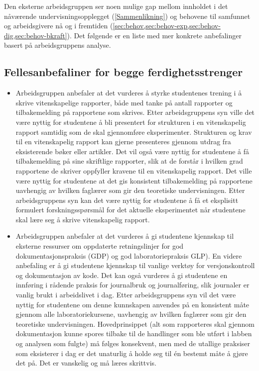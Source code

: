 \documentclass{article}
\begin{document}
Den eksterne arbeidsgruppen ser noen mulige gap mellom innholdet i det nåværende undervisningsopplegget (\cref{Sammenlikning}) og behovene til samfunnet og arbeidsgivere nå og i fremtiden (\cref{sec:behov,sec:behov-exp,sec:behov-dig,sec:behov-bkraft}). Det følgende er en liste med mer konkrete anbefalinger basert på arbeidsgruppens analyse.

\subsection{Fellesanbefaliner for begge ferdighetsstrenger}

\begin{itemize}
 
  
  \item Arbeidsgruppen anbefaler at det vurderes å styrke studentenes trening i å skrive vitenskapelige rapporter, både med tanke på antall rapporter og tilbakemelding på rapportene som skrives. Etter arbeidsgruppens syn ville det være nyttig for studentene å bli presentert for strukturen i en vitenskapelig rapport samtidig som de skal gjennomføre eksperimenter. Strukturen og krav til en vitenskapelig rapport kan gjerne presenteres gjennom utdrag fra eksisterende bøker eller artikler. Det vil også være nyttig for studentene å få tilbakemelding på sine skriftlige rapporter, slik at de forstår i hvilken grad rapportene de skriver oppfyller kravene til en vitenskapelig rapport. Det ville være nyttig for studentene at det gis konsistent tilbakemelding på rapportene uavhengig av hvilken faglærer som gir den teoretiske undervisningen. Etter arbeidsgruppens syn kan det være nyttig for studentene å få et eksplisitt formulert forskningsspørsmål for det aktuelle eksperimentet når studentene skal lære seg å skrive vitenskapelig rapport.

  \item Arbeidsgruppen anbefaler at det vurderes å gi studentene kjennskap til eksterne ressurser om oppdaterte retningslinjer for god dokumentasjonspraksis (GDP) og god laboratoriepraksis GLP). En videre anbefaling er å gi studentene kjennskap til vanlige verktøy for versjonskontroll og dokumentasjon av kode. Det kan også vurderes å gi studentene en innføring i rådende praksis for journalbruk og journalføring, slik journaler er vanlig brukt i arbeidslivet i dag. Etter arbeidsgruppens syn vil det være nyttig for studentene om denne kunnskapen anvendes på en konsistent måte gjennom alle laboratoriekursene, uavhengig av hvilken faglærer som gir den teoretiske undervisningen. {\color{red} Hovedprinsippet (alt som rapporteres skal gjennom dokumentasjon kunne spores tilbake til de handlinger som ble utført i labben og analysen som fulgte) må følges konsekvent, men med de utallige praksiser som eksisterer i dag er det unaturlig å holde seg til én bestemt måte å gjøre det på. Det er vanskelig og må læres skrittvis.}
  

\end{itemize}
\end{document}
